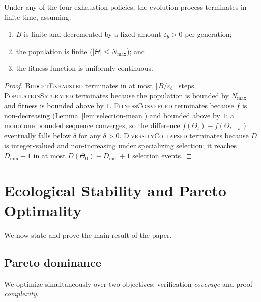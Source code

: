 \documentclass[11pt]{article}
\providecommand{\fitbar}{\bar{f}}           %
\providecommand{\budget}{B}                 %
\begin{document}
\begin{theorem}\label{thm:termination}
Under any of the four exhaustion policies, the evolution process
terminates in finite time, assuming:
\begin{enumerate}[leftmargin=1.5em]
  \item $\budget$ is finite and decremented by a fixed amount
    $\varepsilon_b > 0$ per generation;
  \item the population is finite ($|\Theta| \leq N_{\max}$); and
  \item the fitness function is uniformly continuous.
\end{enumerate}
\end{theorem}
\begin{proof}
\textsc{BudgetExhausted} terminates in at most
$\lfloor \budget / \varepsilon_b \rfloor$ steps.
\textsc{PopulationSaturated} terminates because the population is
bounded by $N_{\max}$ and fitness is bounded above by $1$.
\textsc{FitnessConverged} terminates because $\fitbar$ is non-decreasing
(Lemma~\ref{lem:selection-mean}) and bounded above by $1$: a
monotone bounded sequence converges, so the difference
$\fitbar(\Theta_t) - \fitbar(\Theta_{t-w})$ eventually falls below
$\delta$ for any $\delta > 0$.
\textsc{DiversityCollapsed} terminates because $D$ is integer-valued
and non-increasing under specializing selection; it reaches
$D_{\min}-1$ in at most $D(\Theta_0) - D_{\min} + 1$ selection
events.
\end{proof}

\section{Ecological Stability and Pareto Optimality}\label{sec:stability}

We now state and prove the main result of the paper.

\subsection{Pareto dominance}

We optimize simultaneously over two objectives: verification
\emph{coverage} and proof \emph{complexity}.
\end{document}
